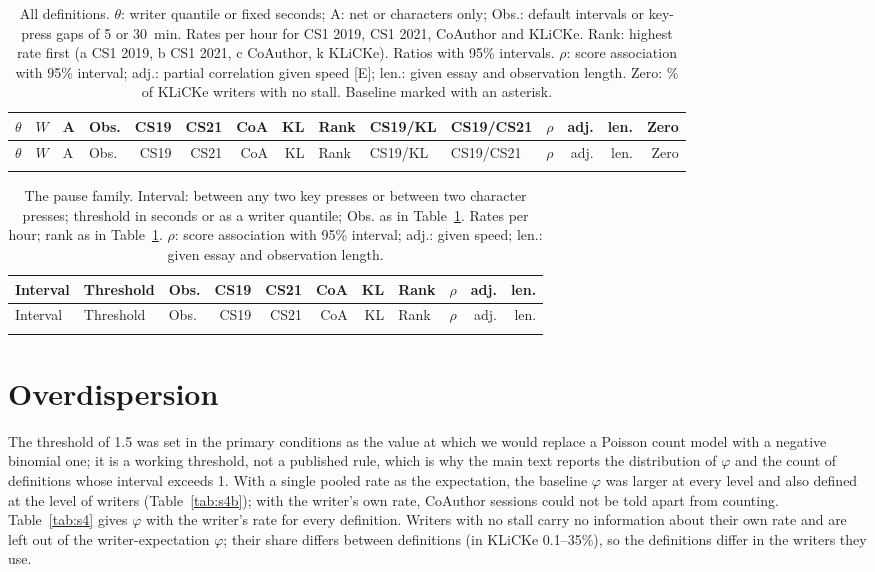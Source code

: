 {\scriptsize
\setlength{\tabcolsep}{2.5pt}
\begin{longtable}{@{}l r l l r r r r l l l l r r r@{}}
\caption{All definitions. $\theta$: writer quantile or fixed seconds; A: net or characters only; Obs.: default
intervals or key-press gaps of 5 or 30~min. Rates per hour for CS1 2019, CS1 2021, CoAuthor and KLiCKe. Rank: highest
rate first (a CS1 2019, b CS1 2021, c CoAuthor, k KLiCKe). Ratios with 95\% intervals. $\rho$: score association with
95\% interval; adj.: partial correlation given speed [E]; len.: given essay and
observation length. Zero: \% of KLiCKe writers with no stall. Baseline marked
with an asterisk.}\label{tab:s3}\\
\toprule
$\theta$ & $W$ & A & Obs. & CS19 & CS21 & CoA & KL & Rank & CS19/KL & CS19/CS21 & $\rho$ & adj. & len. & Zero \\
\midrule
\endfirsthead
\toprule
$\theta$ & $W$ & A & Obs. & CS19 & CS21 & CoA & KL & Rank & CS19/KL & CS19/CS21 & $\rho$ & adj. & len. & Zero \\
\midrule
\endhead
\bottomrule
\endfoot

\end{longtable}
}

{\scriptsize
\setlength{\tabcolsep}{3pt}
\begin{longtable}{@{}l l l r r r r l l r r@{}}
\caption{The pause family. Interval: between any two key presses or between two character presses; threshold in
seconds or as a writer quantile; Obs. as in Table~\ref{tab:s3}. Rates per hour; rank as in Table~\ref{tab:s3}. $\rho$:
score association with 95\% interval; adj.: given speed; len.: given essay and observation length.}\label{tab:spause}\\
\toprule
Interval & Threshold & Obs. & CS19 & CS21 & CoA & KL & Rank & $\rho$ & adj. & len. \\
\midrule
\endfirsthead
\toprule
Interval & Threshold & Obs. & CS19 & CS21 & CoA & KL & Rank & $\rho$ & adj. & len. \\
\midrule
\endhead
\bottomrule
\endfoot

\end{longtable}
}

\section{Overdispersion}
\label{app:phi}

The threshold of 1.5 was set in the primary conditions as the value at which we would replace a Poisson count model with
a negative binomial one; it is a working threshold, not a published rule, which is why the main text reports the
distribution of $\varphi$ and the count of definitions whose interval exceeds 1. With a single pooled rate as the
expectation, the baseline $\varphi$ was larger at every level and also defined at the level of writers
(Table~\ref{tab:s4b}); with the writer's own rate, CoAuthor sessions could not be told apart from counting.
Table~\ref{tab:s4} gives $\varphi$ with the writer's rate for every definition. Writers with no stall carry no
information about their own rate and are left out of the writer-expectation $\varphi$; their share differs between
definitions (in KLiCKe 0.1--35\%), so the definitions differ in the writers they use.

